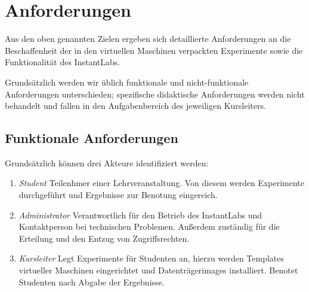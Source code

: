 \section{Anforderungen}
\label{sec:requirements}

		Aus den oben genannten Zielen ergeben sich detaillierte Anforderungen an die Beschaffenheit der in den virtuellen Maschinen verpackten Experimente sowie die Funktionalität des InstantLabs.

		Grundsätzlich werden wir üblich funktionale und nicht-funktionale Anforderungen unterschieden;
		spezifische didaktische Anforderungen werden nicht behandelt und fallen in den Aufgabenbereich des jeweiligen Kursleiters. 

		\subsection{Funktionale Anforderungen}


		Grundsätzlich können drei Akteure identifiziert werden:

		\begin{enumerate}
			\item \emph{Student} Teilenhmer einer Lehrveranstaltung. Von diesem werden Experimente durchgeführt und Ergebnisse zur Benotung eingereich.
			\item \emph{Administrator} Verantwortlich für den Betrieb des InstantLabs und Kontaktperson bei technischen Problemen. Außerdem zuständig für die Erteilung und den Entzug von Zugriffsrechten.
			\item \emph{Kursleiter} Legt Experimente für Studenten an, hierzu werden Templates virtueller Maschinen eingerichtet und Datenträgerimages installiert. Benotet Studenten nach Abgabe der Ergebnisse.
		\end{enumerate}


